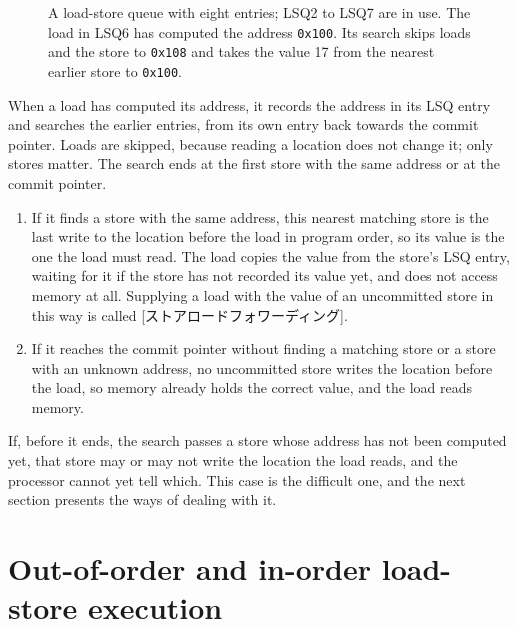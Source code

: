 \documentclass[../main.tex]{subfiles}
\begin{document}
\begin{figure}[htbp]
  \centering
  
  \caption{A load-store queue with eight entries; LSQ2 to LSQ7 are in use.  The
    load in LSQ6 has computed the address \texttt{0x100}.  Its search skips
    loads and the store to \texttt{0x108} and takes the value 17 from the
    nearest earlier store to \texttt{0x100}.}
  \label{fig:l09-lsq}
\end{figure}

When a load has computed its address, it records the address in its LSQ entry
and searches the earlier entries, from its own entry back towards the commit
pointer.  Loads are skipped, because reading a location does not change it;
only stores matter.  The search ends at the first store with the same address
or at the commit pointer.
\begin{enumerate}
  \item If it finds a store with the same address, this nearest matching store
    is the last write to the location before the load in program order, so its
    value is the one the load must read.  The load copies the value from the
    store's LSQ entry, waiting for it if the store has not recorded its value
    yet, and does not access memory at all.  Supplying a load with the value of
    an uncommitted store in this way is called
    [ストアロードフォワーディング].
  \item If it reaches the commit pointer without finding a matching store or a
    store with an unknown address, no uncommitted store writes the location
    before the load, so memory already holds the correct value, and the load
    reads memory.
\end{enumerate}
If, before it ends, the search passes a store whose address has not been
computed yet, that store may or may not write the location the load reads, and
the processor cannot yet tell which.  This case is the difficult one, and the
next section presents the ways of dealing with it.

\section{Out-of-order and in-order load-store execution}
\label{sec:l09-policies}
\end{document}
